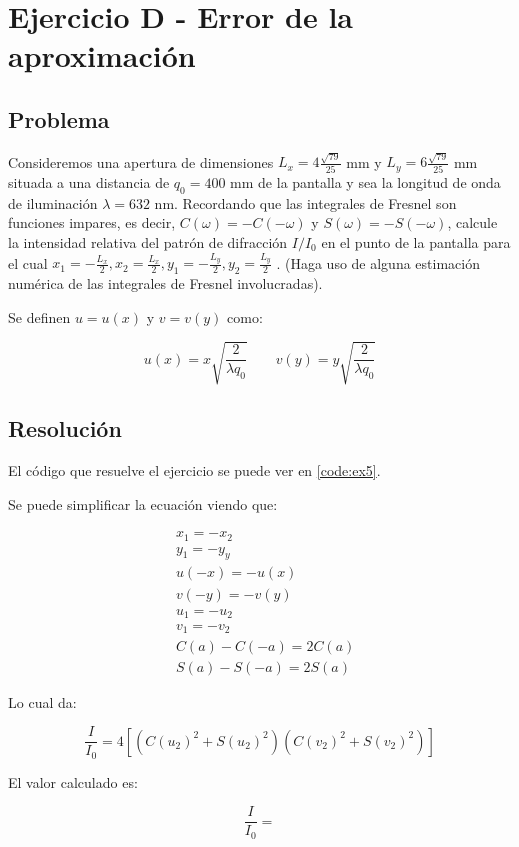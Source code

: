 \section{Ejercicio D - Error de la aproximación}

\subsection{Problema}

Consideremos una apertura de dimensiones 
$L_x = 4\frac{\sqrt{79}}{25}$ mm y $L_y = 6\frac{\sqrt{79}}{25}$ mm situada a una distancia de $q_0 = 400$ mm de la pantalla y sea la longitud de onda de iluminación $\lambda = 632$ nm. 
Recordando que las integrales de Fresnel son funciones impares, es decir, $C(\omega) = -C(-\omega)$ y $S(\omega) = -S(-\omega)$, calcule la intensidad relativa del patrón de difracción $I/I_0$ en el punto de la pantalla para el cual $x_1 = - \frac{L_x}{2}, x_2 = \frac{L_x}{2} , y_1 = -\frac{L_y}{2} , y_2 = \frac{L_y}{2}$ . (Haga uso de alguna estimación numérica de las integrales de Fresnel involucradas).

Se definen $u = u(x)$ y $v = v(y)$ como:

$$
	u(x) = x \sqrt{\frac{2}{\lambda q_0}} \ \ \ \ \ \ \ \ \ 
	v(y) = y \sqrt{\frac{2}{\lambda q_0}}
$$

\subsection{Resolución}


El código que resuelve el ejercicio se puede ver en \ref{code:ex5}. 

Se puede simplificar la ecuación viendo que:

\begin{align*}
	&x_1 = -x_2 \\
	&y_1 = -y_y \\ 
	&u(-x) = -u(x) \\
	&v(-y) = -v(y) \\ 
	&u_1 = -u_2 \\
	&v_1 = -v_2 \\
	&C(a) - C(-a) = 2C(a) \\
	&S(a) - S(-a) = 2S(a)
\end{align*}

Lo cual da:

$$
\frac{I}{I_0} = 4 [
(	C(u_2) ^2 + S(u_2)^2)
(	C(v_2) ^2 + S(v_2)^2)
]
$$

El valor calculado es: 

$$\frac{I}{I_0}  = $$

